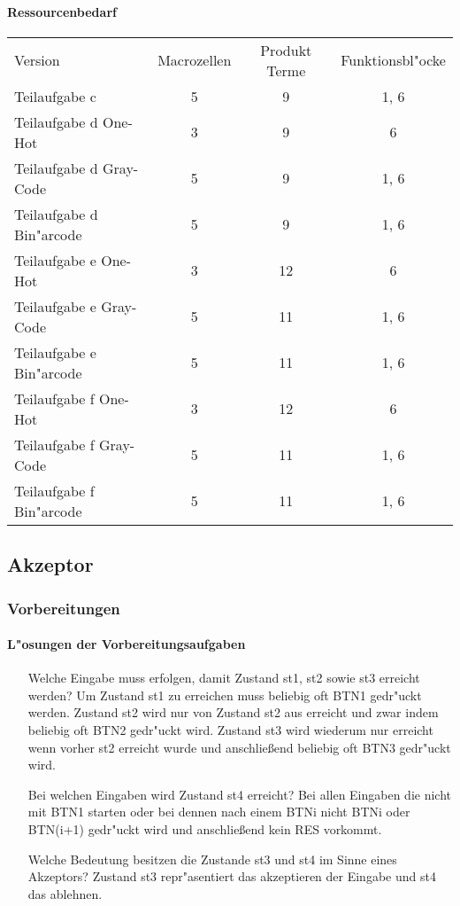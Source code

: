 \documentclass [] {scrartcl}
\begin{document}
  \paragraph{Ressourcenbedarf}
  \begin{table}
    \begin{tabular}{lccc}
      Version & Macrozellen & Produkt Terme & Funktionsbl"ocke\\
      Teilaufgabe c & 5 & 9 & 1, 6\\
      Teilaufgabe d One-Hot & 3 & 9 & 6\\
      Teilaufgabe d Gray-Code & 5 & 9 & 1, 6\\
      Teilaufgabe d Bin"arcode & 5 & 9 & 1, 6\\
      Teilaufgabe e One-Hot & 3 & 12 & 6\\
      Teilaufgabe e Gray-Code & 5 & 11 & 1, 6\\
      Teilaufgabe e Bin"arcode & 5 & 11 & 1, 6\\
      Teilaufgabe f One-Hot & 3 & 12 & 6\\
      Teilaufgabe f Gray-Code & 5 & 11 & 1, 6\\
      Teilaufgabe f Bin"arcode & 5 & 11 & 1, 6\\
    \end{tabular}
  \end{table}
  \subsection{Akzeptor}
  \subsubsection{Vorbereitungen}
  \paragraph{L"osungen der Vorbereitungsaufgaben}
  \begin{itemize}
    \item[Welche Eingabe muss erfolgen, damit Zustand st1, st2 sowie st3 erreicht werden?] 
    Um Zustand st1 zu erreichen muss beliebig oft BTN1 gedr"uckt werden.
    Zustand st2 wird nur von Zustand st2 aus erreicht und zwar indem beliebig oft BTN2 gedr"uckt wird.
    Zustand st3 wird wiederum nur erreicht wenn vorher st2 erreicht wurde und anschließend beliebig oft BTN3 gedr"uckt wird.
    \item[Bei welchen Eingaben wird Zustand st4 erreicht?]
    Bei allen Eingaben die nicht mit BTN1 starten oder bei dennen nach einem BTNi nicht BTNi oder BTN(i+1) gedr"uckt wird und anschließend kein RES vorkommt.
   \item[Welche Bedeutung besitzen die Zustande st3 und st4 im Sinne eines Akzeptors?]
   Zustand st3 repr"asentiert das akzeptieren der Eingabe und st4 das ablehnen.
  \end{itemize}
\end{document}
